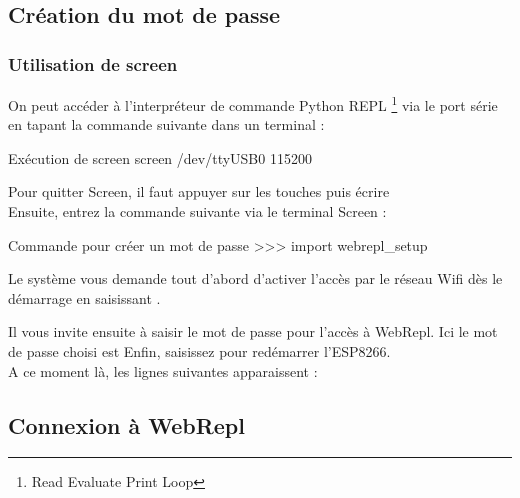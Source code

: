 {\subsection{Création du mot de passe}

\subsubsection{Utilisation de screen}

On peut accéder à l’interpréteur de commande Python REPL \footnote{Read Evaluate Print Loop} via le port série en tapant la commande suivante dans un terminal :

\begin{Bash}{Exécution de screen}
screen /dev/ttyUSB0 115200
\end{Bash}





Pour quitter Screen, il faut appuyer sur les touches  puis écrire  \\

Ensuite, entrez la commande suivante via le terminal Screen :
\begin{Bash}{Commande pour créer un mot de passe}
>>> import webrepl_setup
\end{Bash}

Le système vous demande tout d'abord d’activer l’accès par le réseau Wifi dès le démarrage en saisissant .


Il vous invite ensuite à saisir le mot de passe pour l'accès à WebRepl. Ici le mot de passe choisi est 
Enfin, saisissez  pour redémarrer l'ESP8266.\\
A ce moment là, les lignes suivantes apparaissent : 



\subsection{Connexion à WebRepl}



}
